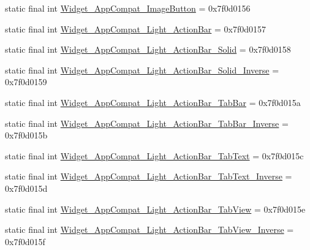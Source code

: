 \begin{DoxyCompactItemize}
\item 
static final int \mbox{\hyperlink{classandroid_1_1support_1_1v7_1_1appcompat_1_1R_1_1style_a75769f520cfe5d9066bdf51b5d01ff07}{Widget\+\_\+\+App\+Compat\+\_\+\+Image\+Button}} = 0x7f0d0156
\item 
static final int \mbox{\hyperlink{classandroid_1_1support_1_1v7_1_1appcompat_1_1R_1_1style_a0dbaf9e73449b6162f7b937d60dcc7f6}{Widget\+\_\+\+App\+Compat\+\_\+\+Light\+\_\+\+Action\+Bar}} = 0x7f0d0157
\item 
static final int \mbox{\hyperlink{classandroid_1_1support_1_1v7_1_1appcompat_1_1R_1_1style_a8749b52940b38a7fcb284f2cb459a72b}{Widget\+\_\+\+App\+Compat\+\_\+\+Light\+\_\+\+Action\+Bar\+\_\+\+Solid}} = 0x7f0d0158
\item 
static final int \mbox{\hyperlink{classandroid_1_1support_1_1v7_1_1appcompat_1_1R_1_1style_ab3afe165048e9644abccc3269d0298ae}{Widget\+\_\+\+App\+Compat\+\_\+\+Light\+\_\+\+Action\+Bar\+\_\+\+Solid\+\_\+\+Inverse}} = 0x7f0d0159
\item 
static final int \mbox{\hyperlink{classandroid_1_1support_1_1v7_1_1appcompat_1_1R_1_1style_a800eec571c7a3a5ae7c9bd34d4de3e2a}{Widget\+\_\+\+App\+Compat\+\_\+\+Light\+\_\+\+Action\+Bar\+\_\+\+Tab\+Bar}} = 0x7f0d015a
\item 
static final int \mbox{\hyperlink{classandroid_1_1support_1_1v7_1_1appcompat_1_1R_1_1style_a2a321c12e9a90c9c2654c6360a358680}{Widget\+\_\+\+App\+Compat\+\_\+\+Light\+\_\+\+Action\+Bar\+\_\+\+Tab\+Bar\+\_\+\+Inverse}} = 0x7f0d015b
\item 
static final int \mbox{\hyperlink{classandroid_1_1support_1_1v7_1_1appcompat_1_1R_1_1style_a9a3d404e709ccc4b6451719ce94471a8}{Widget\+\_\+\+App\+Compat\+\_\+\+Light\+\_\+\+Action\+Bar\+\_\+\+Tab\+Text}} = 0x7f0d015c
\item 
static final int \mbox{\hyperlink{classandroid_1_1support_1_1v7_1_1appcompat_1_1R_1_1style_af00d7bda4d003b15deeea158f097f0d5}{Widget\+\_\+\+App\+Compat\+\_\+\+Light\+\_\+\+Action\+Bar\+\_\+\+Tab\+Text\+\_\+\+Inverse}} = 0x7f0d015d
\item 
static final int \mbox{\hyperlink{classandroid_1_1support_1_1v7_1_1appcompat_1_1R_1_1style_ac19404a25cb26fbc8d23bca6ce4d090d}{Widget\+\_\+\+App\+Compat\+\_\+\+Light\+\_\+\+Action\+Bar\+\_\+\+Tab\+View}} = 0x7f0d015e
\item 
static final int \mbox{\hyperlink{classandroid_1_1support_1_1v7_1_1appcompat_1_1R_1_1style_a21a9aa7a229e40e4a8c82c548231428b}{Widget\+\_\+\+App\+Compat\+\_\+\+Light\+\_\+\+Action\+Bar\+\_\+\+Tab\+View\+\_\+\+Inverse}} = 0x7f0d015f

\end{DoxyCompactItemize}
